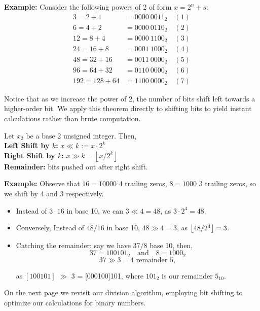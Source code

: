 \textbf{Example:} Consider the following powers of 2 of form $x=2^n+s$:
\begin{align*}
    3 = 2 + 1 &= 0000 \ 0011_2 \quad (1) \\
    6 = 4 + 2 &= 0000 \ 0110_2 \quad (2) \\
    12 = 8 + 4 &= 0000 \ 1100_2 \quad (3) \\
    24 = 16 + 8 &= 0001 \ 1000_2 \quad (4) \\
    48 = 32 + 16 &= 0011 \ 0000_2 \quad (5) \\
    96 = 64 + 32 &= 0110 \ 0000_2 \quad (6) \\
    192 = 128 + 64 &= 1100 \ 0000_2 \quad (7)
\end{align*}

\noindent
Notice that as we increase the power of 2, the number of bits shift left towards a higher-order bit. We apply this theorem directly to 
shifting bits to yield instant calculations rather than brute computation.

\begin{theo}

    Let $x_2$ be a base 2 unsigned integer. Then,\\
    \noindent
    \textbf{Left Shift by $k$:} $x \ll k:= x \cdot 2^k$\\
    \noindent
    \textbf{Right Shift by $k$:} $x \gg k = \left\lfloor x/2^k \right\rfloor$\\
    \textbf{Remainder:} bits pushed out after right shift.
\end{theo}
\noindent
\textbf{Example:} Observe that $16=10000$ 4 trailing zeros, $8=1000$ 3 trailing zeros, so we shift by 4 and 3 respectively.
\begin{itemize}
    \item Instead of $3 \cdot 16$ in base 10, we can $3 \ll 4=48$, as $3 \cdot 2^4 = 48$.
    \item Conversely, Instead of $48/16$ in base 10, $48 \gg 4 = 3$, as $\floor*{48/2^4} = 3$.
    \item Catching the remainder: say we have $37/8$ base 10, then,
        \[ 37 = 100101_2 \quad \text{and} \quad 8 = 1000_2 \]
        \[ 37 \gg 3 = 4 \text{ remainder } 5, \]

    \noindent    
    as  $[100101]$ $\gg$ 3 = [000100]101, where $101_2$ is our remainder $5_{10}$.
\end{itemize}

\noindent
On the next page we revisit our division algorithm, employing bit shifting to optimize our calculations for binary numbers.

